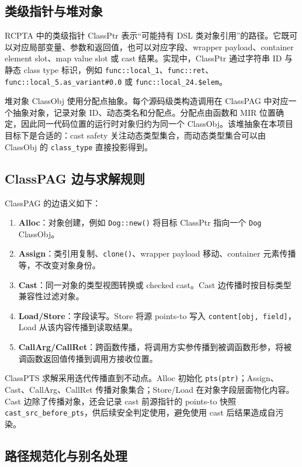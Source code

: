 \documentclass[10.5pt,compsoc,UTF8]{cjc}
\theoremstyle{mystyle}
\begin{document}
\subsection{类级指针与堆对象}

RCPTA 中的类级指针 ClassPtr 表示“可能持有 DSL 类对象引用”的路径。它既可以对应局部变量、参数和返回值，也可以对应字段、wrapper payload、container element slot、map value slot 或 cast 结果。实现中，ClassPtr 通过字符串 ID 与静态 class type 标识，例如 \texttt{func::local\_1}、\texttt{func::ret}、\texttt{func::local\_5.as\_variant\#0.0} 或 \texttt{func::local\_24.\$elem}。

堆对象 ClassObj 使用分配点抽象。每个源码级类构造调用在 ClassPAG 中对应一个抽象对象，记录对象 ID、动态类名和分配点。分配点由函数和 MIR 位置确定，因此同一代码位置的运行时对象归约为同一个 ClassObj。该堆抽象在本项目目标下是合适的：cast safety 关注动态类型集合，而动态类型集合可以由 ClassObj 的 \texttt{class\_type} 直接投影得到。

\subsection{ClassPAG 边与求解规则}

ClassPAG 的边语义如下：

\begin{enumerate}
    \item \textbf{Alloc}：对象创建，例如 \texttt{Dog::new()} 将目标 ClassPtr 指向一个 \texttt{Dog} ClassObj。
    \item \textbf{Assign}：类引用复制、\texttt{clone()}、wrapper payload 移动、container 元素传播等，不改变对象身份。
    \item \textbf{Cast}：同一对象的类型视图转换或 checked cast。Cast 边传播时按目标类型兼容性过滤对象。
    \item \textbf{Load/Store}：字段读写。Store 将源 points-to 写入 \texttt{content[obj, field]}，Load 从该内容传播到读取结果。
    \item \textbf{CallArg/CallRet}：跨函数传播，将调用方实参传播到被调函数形参，将被调函数返回值传播到调用方接收位置。
\end{enumerate}

ClassPTS 求解采用迭代传播直到不动点。Alloc 初始化 \texttt{pts(ptr)}；Assign、Cast、CallArg、CallRet 传播对象集合；Store/Load 在对象字段层面物化内容。Cast 边除了传播对象，还会记录 cast 前源指针的 points-to 快照 \texttt{cast\_src\_before\_pts}，供后续安全判定使用，避免使用 cast 后结果造成自污染。

\subsection{路径规范化与别名处理}
\end{document}
